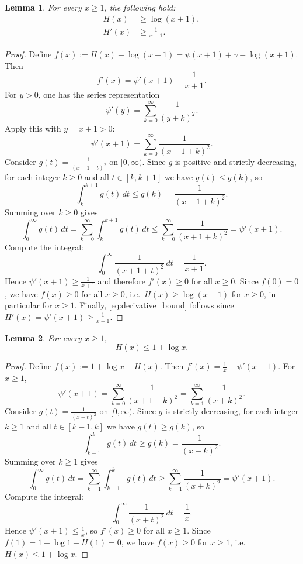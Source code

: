 \documentclass{article}
\newtheorem{lemma}{Lemma}[section]
\begin{document}
\begin{lemma}\label{lem:lower_bounds}
For every $x\ge 1$, the following hold:
\begin{align}
H(x) &\ge \log(x+1), \label{eq:lower_bound}\\
H'(x) &\ge \frac{1}{x+1}. \label{eq:derivative_bound}
\end{align}
\end{lemma}

\begin{proof}
Define $f(x):=H(x)-\log(x+1)=\psi(x+1)+\gamma-\log(x+1)$. Then
\[
f'(x)=\psi'(x+1)-\frac{1}{x+1}.
\]
For $y>0$, one has the series representation
\[
\psi'(y)=\sum_{k=0}^\infty \frac{1}{(y+k)^2}.
\]
Apply this with $y=x+1>0$:
\[
\psi'(x+1)=\sum_{k=0}^\infty \frac{1}{(x+1+k)^2}.
\]
Consider $g(t)=\frac{1}{(x+1+t)^2}$ on $[0,\infty)$. Since $g$ is positive and strictly decreasing, for each integer $k\ge 0$ and all $t\in[k,k+1]$ we have $g(t)\le g(k)$, so
\[
\int_k^{k+1} g(t)\,dt \le g(k)=\frac{1}{(x+1+k)^2}.
\]
Summing over $k\ge 0$ gives
\[
\int_0^\infty g(t)\,dt=\sum_{k=0}^\infty\int_k^{k+1} g(t)\,dt
\le \sum_{k=0}^\infty \frac{1}{(x+1+k)^2}=\psi'(x+1).
\]
Compute the integral:
\[
\int_0^\infty \frac{1}{(x+1+t)^2}\,dt=\frac{1}{x+1}.
\]
Hence $\psi'(x+1)\ge \frac{1}{x+1}$ and therefore $f'(x)\ge 0$ for all $x\ge 0$. Since $f(0)=0$, we have $f(x)\ge 0$ for all $x\ge 0$, i.e.\ $H(x)\ge \log(x+1)$ for $x\ge 0$, in particular for $x\ge 1$.
Finally, \eqref{eq:derivative_bound} follows since $H'(x)=\psi'(x+1)\ge \frac{1}{x+1}$.
\end{proof}

\begin{lemma}\label{lem:upper_bound}
For every $x\ge 1$,
\begin{equation}\label{eq:upper_bound}
H(x)\le 1+\log x.
\end{equation}
\end{lemma}

\begin{proof}
Define $f(x):=1+\log x - H(x)$. Then $f'(x)=\frac{1}{x}-\psi'(x+1)$.
For $x\ge 1$,
\[
\psi'(x+1)=\sum_{k=0}^\infty \frac{1}{(x+1+k)^2}=\sum_{k=1}^\infty \frac{1}{(x+k)^2}.
\]
Consider $g(t)=\frac{1}{(x+t)^2}$ on $[0,\infty)$. Since $g$ is strictly decreasing, for each integer $k\ge 1$ and all $t\in[k-1,k]$ we have $g(t)\ge g(k)$, so
\[
\int_{k-1}^{k} g(t)\,dt \ge g(k)=\frac{1}{(x+k)^2}.
\]
Summing over $k\ge 1$ gives
\[
\int_0^\infty g(t)\,dt=\sum_{k=1}^\infty \int_{k-1}^{k} g(t)\,dt
\ge \sum_{k=1}^\infty \frac{1}{(x+k)^2}=\psi'(x+1).
\]
Compute the integral:
\[
\int_0^\infty \frac{1}{(x+t)^2}\,dt=\frac{1}{x}.
\]
Hence $\psi'(x+1)\le \frac{1}{x}$, so $f'(x)\ge 0$ for all $x\ge 1$.
Since $f(1)=1+\log 1 - H(1)=0$, we have $f(x)\ge 0$ for $x\ge 1$, i.e.\ $H(x)\le 1+\log x$.
\end{proof}
\end{document}
